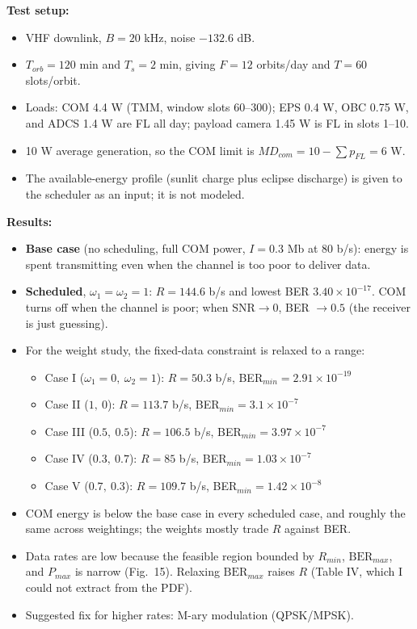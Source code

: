 \documentclass[11pt]{article}
\begin{document}
\textbf{Test setup:}
\begin{itemize}[noitemsep]
    \item VHF downlink, $B = 20$ kHz, noise $-132.6$ dB.
    \item $T_{orb} = 120$ min and $T_s = 2$ min, giving $F = 12$ orbits/day and $T = 60$ slots/orbit.
    \item Loads: COM 4.4 W (TMM, window slots 60--300); EPS 0.4 W, OBC 0.75 W, and ADCS 1.4 W are FL all day; payload camera 1.45 W is FL in slots 1--10.
    \item 10 W average generation, so the COM limit is $MD_{com} = 10 - \sum p_{FL} = 6$ W.
    \item The available-energy profile (sunlit charge plus eclipse discharge) is given to the scheduler as an input; it is not modeled.
\end{itemize}

\textbf{Results:}
\begin{itemize}[noitemsep]
    \item \textbf{Base case} (no scheduling, full COM power, $I = 0.3$ Mb at 80 b/s): energy is spent transmitting even when the channel is too poor to deliver data.
    \item \textbf{Scheduled}, $\omega_1=\omega_2=1$: $R = 144.6$ b/s and lowest BER $3.40\times10^{-17}$. COM turns off when the channel is poor; when $\mathrm{SNR}\to 0$, BER $\to 0.5$ (the receiver is just guessing).
    \item For the weight study, the fixed-data constraint is relaxed to a range:
    \begin{itemize}[noitemsep]
        \item Case I ($\omega_1=0,\ \omega_2=1$): $R = 50.3$ b/s, BER$_{min} = 2.91\times10^{-19}$
        \item Case II ($1,\ 0$): $R = 113.7$ b/s, BER$_{min} = 3.1\times10^{-7}$
        \item Case III ($0.5,\ 0.5$): $R = 106.5$ b/s, BER$_{min} = 3.97\times10^{-7}$
        \item Case IV ($0.3,\ 0.7$): $R = 85$ b/s, BER$_{min} = 1.03\times10^{-7}$
        \item Case V ($0.7,\ 0.3$): $R = 109.7$ b/s, BER$_{min} = 1.42\times10^{-8}$
    \end{itemize}
    \item COM energy is below the base case in every scheduled case, and roughly the same across weightings; the weights mostly trade $R$ against BER.
    \item Data rates are low because the feasible region bounded by $R_{min}$, $\mathrm{BER}_{max}$, and $P_{max}$ is narrow (Fig.\ 15). Relaxing $\mathrm{BER}_{max}$ raises $R$ (Table IV, which I could not extract from the PDF).
    \item Suggested fix for higher rates: M-ary modulation (QPSK/MPSK).
\end{itemize}
\end{document}
